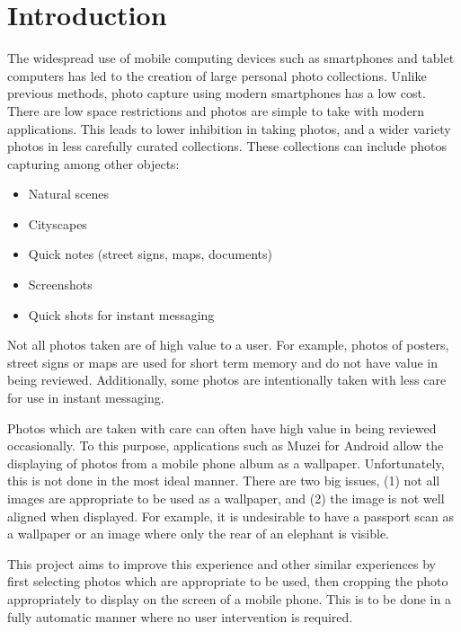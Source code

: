 %


\chapter{Introduction}

The widespread use of mobile computing devices such as smartphones and tablet
computers has led to the creation of large personal photo collections.
Unlike previous methods, photo capture using modern smartphones has a low cost.
There are low space restrictions and photos are simple to take with modern
applications.
This leads to lower inhibition in taking photos, and a wider variety photos in
less carefully curated collections.
These collections can include photos capturing among other objects:

\begin{itemize}
\item Natural scenes
\item Cityscapes
\item Quick notes (street signs, maps, documents)
\item Screenshots
\item Quick shots for instant messaging
\end{itemize}

Not all photos taken are of high value to a user.
For example, photos of posters, street signs or maps are used for short term
memory and do not have value in being reviewed.
Additionally, some photos are intentionally taken with less care for use in
instant messaging.

Photos which are taken with care can often have high value in being reviewed
occasionally.
To this purpose, applications such as Muzei for Android allow the displaying of
photos from a mobile phone album as a wallpaper.
Unfortunately, this is not done in the most ideal manner.
There are two big issues, (1) not all images are appropriate to be used as a
wallpaper, and (2) the image is not well aligned when displayed.
For example, it is undesirable to have a passport scan as a wallpaper or an
image where only the rear of an elephant is visible.

This project aims to improve this experience and other similar experiences by
first selecting photos which are appropriate to be used, then cropping the photo
appropriately to display on the screen of a mobile phone.
This is to be done in a fully automatic manner where no user intervention is
required.

